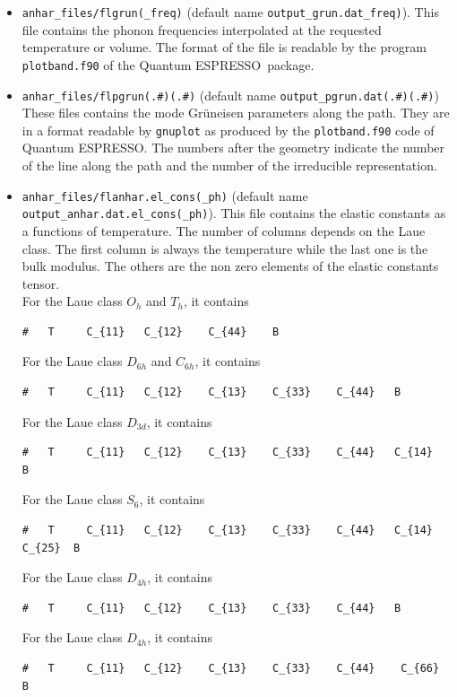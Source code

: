 \documentclass[12pt,a4paper]{article}
\def\qe{{\sc Quantum ESPRESSO}}
\begin{document}
\begin{itemize}
\item 
\texttt{anhar\_files/flgrun(\_freq)} 
(default name \texttt{output\_grun.dat\_freq)}).
This file contains the phonon frequencies interpolated at the requested 
temperature or volume. The format of the file is readable by the program
\texttt{plotband.f90} of the \qe\ package.

\item 
\texttt{anhar\_files/flpgrun(.\#)(.\#)} 
(default name \texttt{output\_pgrun.dat(.\#)(.\#)})
These files contains the mode Gr\"uneisen parameters along the path.
They are in a format readable by \texttt{gnuplot} as produced by 
the \texttt{plotband.f90} code of \qe. The numbers after the geometry indicate the number of the line 
along the path and the number of the irreducible representation.

\item
\texttt{anhar\_files/flanhar.el\_cons(\_ph)}
(default name \texttt{output\_anhar.dat.el\_cons(\_ph)}). This file
contains the elastic constants as a functions of temperature. The number
of columns depends on the Laue class. The first column is always the 
temperature while the last one is the bulk modulus. The others are the
non zero elements of the elastic constants tensor. \\ 
For the Laue class $O_h$ and $T_h$, it contains
\begin{verbatim}
#   T     C_{11}   C_{12}    C_{44}    B
\end{verbatim}
For the Laue class $D_{6h}$ and $C_{6h}$, it contains
\begin{verbatim}
#   T     C_{11}   C_{12}    C_{13}    C_{33}    C_{44}   B
\end{verbatim}
For the Laue class $D_{3d}$, it contains
\begin{verbatim}
#   T     C_{11}   C_{12}    C_{13}    C_{33}    C_{44}   C_{14}   B
\end{verbatim}
For the Laue class $S_{6}$, it contains
\begin{verbatim}
#   T     C_{11}   C_{12}    C_{13}    C_{33}    C_{44}   C_{14}   C_{25}  B
\end{verbatim}
For the Laue class $D_{4h}$, it contains
\begin{verbatim}
#   T     C_{11}   C_{12}    C_{13}    C_{33}    C_{44}   B
\end{verbatim}
For the Laue class $D_{4h}$, it contains
\begin{verbatim}
#   T     C_{11}   C_{12}    C_{13}    C_{33}    C_{44}    C_{66}   B
\end{verbatim}

\end{itemize}
\end{document}

